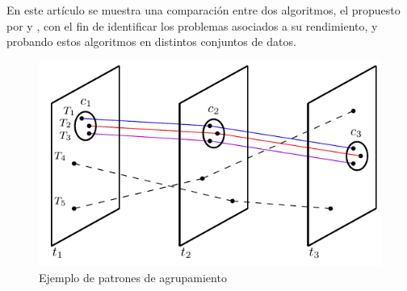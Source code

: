 En este artículo se muestra una comparación entre dos algoritmos, el propuesto por \cite{vieira2009line} y 
\cite{romero2011mining}, con el fin de identificar los problemas asociados a su rendimiento, y probando
estos algoritmos en distintos conjuntos de datos.


\begin{figure}
  \centering
  \includegraphics[scale=0.8]{pictures/flock_example}
  \caption{Ejemplo de patrones de agrupamiento} %
  \label{fig:flockexample}
\end{figure}